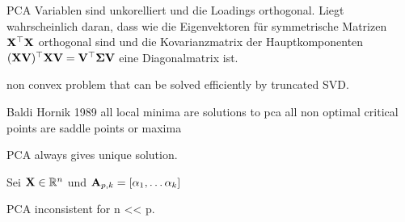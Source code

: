 PCA Variablen sind unkorelliert und die Loadings orthogonal. Liegt wahrscheinlich daran, dass wie die Eigenvektoren für symmetrische Matrizen $\mathbf{X}^{\top}\mathbf{X}$ orthogonal sind und die Kovarianzmatrix der Hauptkomponenten $(\mathbf{X} \mathbf{V})^{\top}\mathbf{X} \mathbf{V} = \mathbf{V}^{\top}\mathbf{\Sigma} \mathbf{V}$ eine Diagonalmatrix ist.

non convex problem that can be solved efficiently by truncated SVD.

Baldi Hornik 1989
all local minima are solutions to pca
all non optimal critical points are saddle points or maxima

\begin{thm}
PCA always gives unique solution.
\end{thm}

\begin{thm}
Sei $\mathbf{X} \in \mathbb{R}^n$ und $\mathbf{A}_{p,k} = [\alpha_1, \ldots \alpha_k] $   
\end{thm}

\begin{thm}
PCA inconsistent for n << p.
\end{thm}

